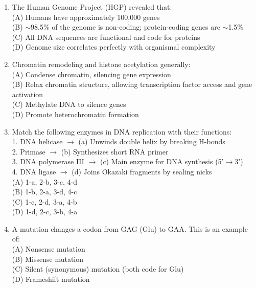\documentclass{article}
\begin{document}
\begin{enumerate}[label=Q\arabic*.]
\item The Human Genome Project (HGP) revealed that:
\\(A) Humans have approximately 100,000 genes
\\(B) $\sim$98.5\% of the genome is non-coding; protein-coding genes are $\sim$1.5\%
\\(C) All DNA sequences are functional and code for proteins
\\(D) Genome size correlates perfectly with organismal complexity

\item Chromatin remodeling and histone acetylation generally:
\\(A) Condense chromatin, silencing gene expression
\\(B) Relax chromatin structure, allowing transcription factor access and gene activation
\\(C) Methylate DNA to silence genes
\\(D) Promote heterochromatin formation

\item Match the following enzymes in DNA replication with their functions:\\
1. DNA helicase $\rightarrow$ (a) Unwinds double helix by breaking H-bonds\\
2. Primase $\rightarrow$ (b) Synthesizes short RNA primer\\
3. DNA polymerase III $\rightarrow$ (c) Main enzyme for DNA synthesis (5'$\rightarrow$3')\\
4. DNA ligase $\rightarrow$ (d) Joins Okazaki fragments by sealing nicks
\\(A) 1-a, 2-b, 3-c, 4-d
\\(B) 1-b, 2-a, 3-d, 4-c
\\(C) 1-c, 2-d, 3-a, 4-b
\\(D) 1-d, 2-c, 3-b, 4-a

\item A mutation changes a codon from GAG (Glu) to GAA. This is an example of:
\\(A) Nonsense mutation
\\(B) Missense mutation
\\(C) Silent (synonymous) mutation (both code for Glu)
\\(D) Frameshift mutation

\end{enumerate}
\end{document}
